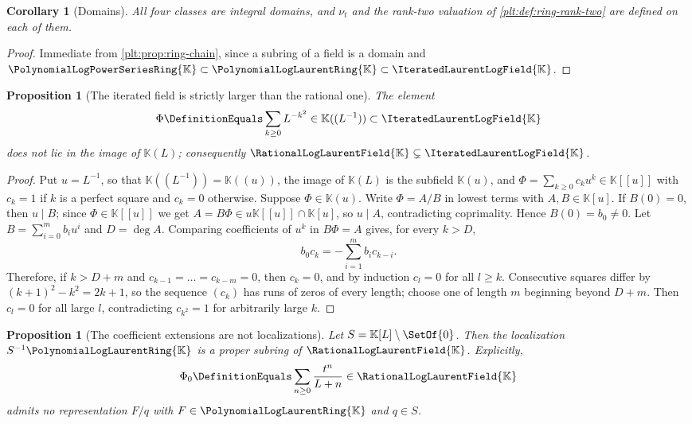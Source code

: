 \documentclass[11pt,oneside]{article}
\theoremstyle{plain}
\newtheorem{proposition}[theorem]{Proposition}
\newtheorem{corollary}[theorem]{Corollary}
\theoremstyle{definition}
\theoremstyle{remark}
\newcommand{\K}{\mathbb{K}}
\newcommand{\PLpow}{\PolynomialLogPowerSeriesRing{\K}}   %
\newcommand{\PLlau}{\PolynomialLogLaurentRing{\K}}       %
\newcommand{\PLrat}{\RationalLogLaurentField{\K}}        %
\newcommand{\PLit}{\IteratedLaurentLogField{\K}}         %
\newcommand{\ordt}{\nu_{t}}                              %
\begin{document}
\begin{corollary}[Domains]
\label{plt:cor:ring-domains}
All four classes are integral domains, and \(\ordt\) and the rank-two
valuation of \cref{plt:def:ring-rank-two} are defined on each of them.
\end{corollary}

\begin{proof}
Immediate from \cref{plt:prop:ring-chain}, since a subring of a field is a
domain and \(\PLpow\subset\PLlau\subset\PLit\).
\end{proof}

\begin{proposition}[The iterated field is strictly larger than the rational one]
\label{plt:prop:ring-PLit-strict}
The element
\begin{equation}\label{plt:eq:ring-lacunary}
  \Phi\DefinitionEquals\sum_{k\ge0}L^{-k^2}\in\K((L^{-1}))\subset\PLit
\end{equation}
does not lie in the image of \(\K(L)\); consequently
\(\PLrat\subsetneq\PLit\).
\end{proposition}

\begin{proof}
Put \(u=L^{-1}\), so that \(\K((L^{-1}))=\K((u))\), the image of \(\K(L)\) is
the subfield \(\K(u)\), and \(\Phi=\sum_{k\ge0}c_ku^k\in\K[[u]]\) with
\(c_k=1\) if \(k\) is a perfect square and \(c_k=0\) otherwise.  Suppose
\(\Phi\in\K(u)\).  Write \(\Phi=A/B\) in lowest terms with
\(A,B\in\K[u]\).  If \(B(0)=0\), then \(u\mid B\); since
\(\Phi\in\K[[u]]\) we get \(A=B\Phi\in u\K[[u]]\cap\K[u]\), so \(u\mid A\),
contradicting coprimality.  Hence \(B(0)=b_0\ne0\).  Let
\(B=\sum_{i=0}^{m}b_iu^i\) and \(D=\deg A\).  Comparing coefficients of
\(u^k\) in \(B\Phi=A\) gives, for every \(k>D\),
\[
  b_0c_k=-\sum_{i=1}^{m}b_ic_{k-i}.
\]
Therefore, if \(k>D+m\) and \(c_{k-1}=\dots=c_{k-m}=0\), then \(c_k=0\), and
by induction \(c_l=0\) for all \(l\ge k\).  Consecutive squares differ by
\((k+1)^2-k^2=2k+1\), so the sequence \((c_k)\) has runs of zeros of every
length; choose one of length \(m\) beginning beyond \(D+m\).  Then \(c_l=0\)
for all large \(l\), contradicting \(c_{k^2}=1\) for arbitrarily large \(k\).
\end{proof}

\begin{proposition}[The coefficient extensions are not localizations]
\label{plt:prop:ring-not-localization}
Let \(S=\K[L]\setminus\SetOf{0}\).  Then the localization
\(S^{-1}\PLlau\) is a proper subring of \(\PLrat\).  Explicitly,
\begin{equation}\label{plt:eq:ring-no-common-denominator}
  \Phi_0\DefinitionEquals\sum_{n\ge0}\frac{t^n}{L+n}\in\PLrat
\end{equation}
admits no representation \(F/q\) with \(F\in\PLlau\) and
\(q\in S\).
\end{proposition}
\end{document}
